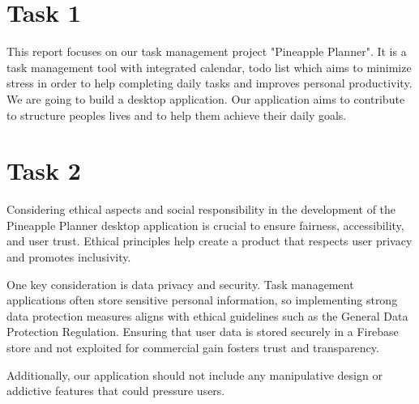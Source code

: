 \documentclass{article}
\begin{document}
\newpage

\section{Task 1}
This report focuses on our task management project "Pineapple Planner".
It is a task management tool with integrated calendar, todo list which aims to minimize stress in order to help completing daily tasks and improves personal productivity.
We are going to build a desktop application.
Our application aims to contribute to structure peoples lives and to help them achieve their daily goals.

\section{Task 2}
Considering ethical aspects and social responsibility in the development of the Pineapple Planner desktop application is crucial to ensure fairness, accessibility, and user trust.
Ethical principles help create a product that respects user privacy and promotes inclusivity.

One key consideration is data privacy and security.
Task management applications often store sensitive personal information, so implementing strong data protection measures aligns with ethical guidelines such as the General Data Protection Regulation.
Ensuring that user data is stored securely in a Firebase store and not exploited for commercial gain fosters trust and transparency.
\cite{hoofnagle2019european}

Additionally, our application should not include any manipulative design or addictive features that could pressure users.
\cite{montag2019addictive}
\end{document}
